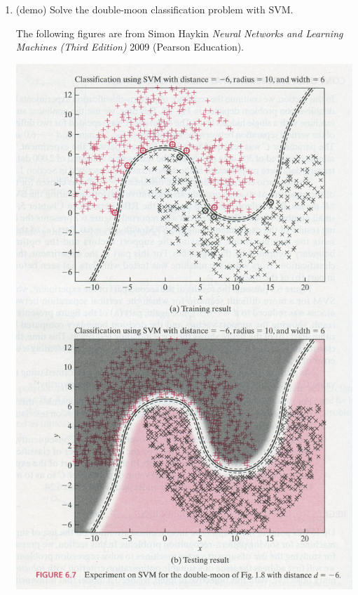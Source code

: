 \begin{enumerate}
\begin{solution}
  \end{solution}


\item (demo) Solve the double-moon classification problem with SVM.

  \begin{solution}
    The following figures are from Simon Haykin \emph{Neural Networks
      and Learning Machines (Third Edition)} 2009 (Pearson Education).

    \begin{center}
      \includegraphics[width=0.7\linewidth]{ex08_05_svm.jpg}
    \end{center}
  \end{solution}
    
\end{enumerate}

